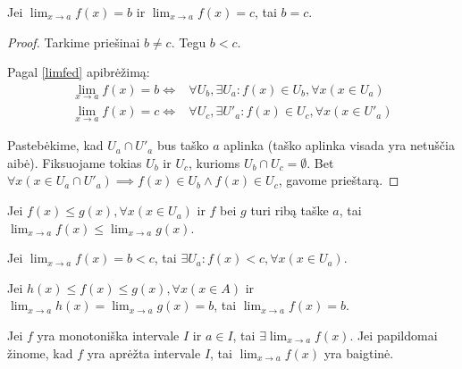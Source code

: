 \begin{prop}
  Jei $\lim_{x \to a} f(x) = b$ ir $\lim_{x \to a} f(x) = c$, tai $b = c$.
  \begin{proof}
    Tarkime priešinai $b \neq c$. Tegu $b < c$.

    Pagal \ref{limfed} apibrėžimą:
    \begin{align*}
      \lim_{x \to a} f(x) = b \iff&%
        \forall U_{b}, \exists U_{a} :%
        f(x) \in U_{b}, \forall x(x \in U_{a}) \\
      \lim_{x \to a} f(x) = c \iff&%
        \forall U_{c}, \exists U'_{a} :%
        f(x) \in U_{c}, \forall x(x \in U'_{a})
    \end{align*}

    Pastebėkime, kad $U_{a} \cap U'_{a}$ bus taško $a$ aplinka (taško 
    aplinka visada yra netuščia aibė).
    Fiksuojame tokias $U_{b}$ ir $U_{c}$, kurioms 
    $U_{b} \cap U_{c} = \emptyset$. Bet 
    $\forall x (x \in U_{a} \cap U'_{a}) \implies%
      f(x) \in U_{b} \land f(x) \in U_{c}$, gavome prieštarą.
  \end{proof}
\end{prop}

\begin{prop}
  Jei $f(x) \leq g(x), \forall x (x \in U_{a})$ ir $f$ bei $g$ turi ribą
  taške $a$, tai $\lim_{x \to a} f(x) \leq \lim_{x \to a} g(x)$.
\end{prop}

\begin{prop}
  Jei $\lim_{x \to a} f(x) = b < c$, tai 
  $\exists U_{a} : f(x) < c, \forall x (x \in U_{a})$.
\end{prop}

\begin{prop}
  Jei $h(x) \leq f(x) \leq g(x), \forall x(x \in A)$ ir 
  $\lim_{x \to a} h(x) = \lim_{x \to a} g(x) = b$, tai
  $\lim_{x \to a} f(x) = b$.
\end{prop}

\begin{prop}
  Jei $f$ yra monotoniška intervale $I$ ir $a \in I$, tai 
  $\exists \lim_{x \to a} f(x)$. Jei papildomai žinome, kad $f$ yra
  aprėžta intervale $I$, tai $\lim_{x \to a} f(x)$ yra baigtinė.
\end{prop}

